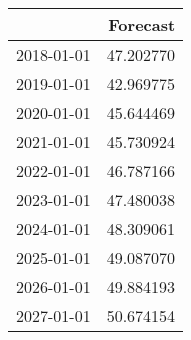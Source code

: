 \begin{tabular}{lr}
\toprule
{} &   Forecast \\
\midrule
2018-01-01 &  47.202770 \\
2019-01-01 &  42.969775 \\
2020-01-01 &  45.644469 \\
2021-01-01 &  45.730924 \\
2022-01-01 &  46.787166 \\
2023-01-01 &  47.480038 \\
2024-01-01 &  48.309061 \\
2025-01-01 &  49.087070 \\
2026-01-01 &  49.884193 \\
2027-01-01 &  50.674154 \\
\bottomrule
\end{tabular}

